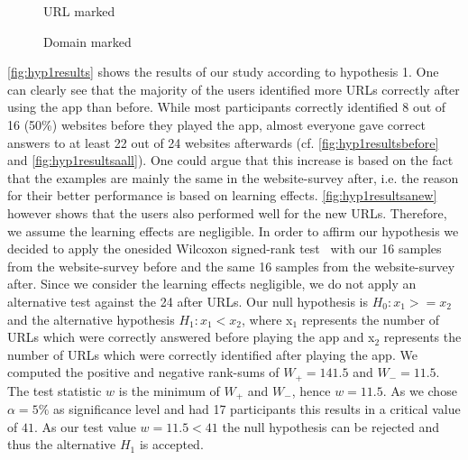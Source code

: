 \begin{figure}
\centering
{}
\caption{URL marked}
\label{fig:hyp2results}
\end{figure}

\begin{figure}
\centering
{}
\caption{Domain marked}
\label{fig:hyp3results}
\end{figure}

\begin{description}[leftmargin=0cm]
\item[Hypothesis 1:]
\autoref{fig:hyp1results} shows the results of our study according to hypothesis 1. One can clearly see that the majority of the users identified more URLs correctly after using the app than before. While most participants correctly identified 8 out of 16 (50\%) websites before they played the app, almost everyone gave correct answers to at least 22 out of 24 websites afterwards (cf. \autoref{fig:hyp1resultsbefore} and \autoref{fig:hyp1resultsaall}). One could argue that this increase is based on the fact that the examples are mainly the same in the website-survey after, i.e. the reason for their better performance is based on learning effects. \autoref{fig:hyp1resultsanew} however shows that the users also performed well for the new URLs. Therefore, we assume the learning effects are negligible.
In order to affirm our hypothesis we decided to apply the onesided Wilcoxon signed-rank test~\cite{wilcoxon1945individual} with our 16 samples from the website-survey before and the same 16 samples from the website-survey after.
Since we consider the learning effects negligible, we do not apply an alternative test against the 24 after URLs.
Our null hypothesis is $H_{0}: x_{1} >= x_{2}$ and the alternative hypothesis $H_{1}: x_{1} < x_{2}$, where x$_{1}$ represents the number of URLs which were correctly answered before playing the app and x$_{2}$ represents the number of URLs which were correctly identified after playing the app.
We computed the positive and negative rank-sums of $W_{+} = 141.5$ and $W_{-} = 11.5$.
The test statistic $w$ is the minimum of $W_{+}$ and $W_{-}$, hence $w = 11.5$.
As we chose $\alpha = 5\%$ as significance level and had 17 participants this results in a critical value of $41$.
As our test value $w = 11.5 < 41$ the null hypothesis can be rejected and thus the alternative $H_{1}$ is accepted.

\end{description}
